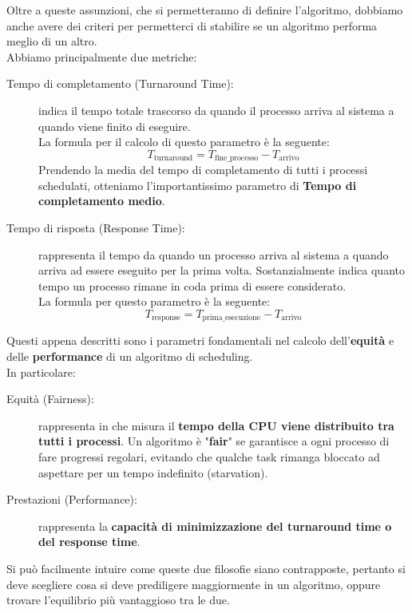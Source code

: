 \documentclass[12pt]{report}
\begin{document}
	Oltre a queste assunzioni, che si permetteranno di definire l'algoritmo, dobbiamo anche avere dei criteri per permetterci di stabilire se un algoritmo performa meglio di un altro.\\
	Abbiamo principalmente due metriche:
	\begin{description}
		\item [Tempo di completamento (Turnaround Time):] indica il tempo totale trascorso da quando il processo arriva al sistema a quando viene finito di eseguire.\\
		La formula per il calcolo di questo parametro è la seguente:
		\[
			T_\text{turnaround} = T_\text{fine\_processo} - T_\text{arrivo}
		\]
		Prendendo la media del tempo di completamento di tutti i processi schedulati, otteniamo l'importantissimo parametro di \textbf{Tempo di completamento medio}.
		
		\item[Tempo di risposta (Response Time):] rappresenta il tempo da quando un processo arriva al sistema a quando arriva ad essere eseguito per la prima volta. Sostanzialmente indica quanto tempo un processo rimane in coda prima di essere considerato.\\
		La formula per questo parametro è la seguente:
		\[
			T_\text{response} = T_\text{prima\_esecuzione} - T_\text{arrivo}
		\]
	\end{description}
	
	Questi appena descritti sono i parametri fondamentali nel calcolo dell'\textbf{equità} e delle \textbf{performance} di un algoritmo di scheduling.\\
	In particolare:
	\begin{description}
		\item [Equità (Fairness):] rappresenta in che misura il \textbf{tempo della CPU viene distribuito tra tutti i processi}. Un algoritmo è "\textbf{fair}" se garantisce a ogni processo di fare progressi regolari, evitando che qualche task rimanga bloccato ad aspettare per un tempo indefinito (starvation).
		
		\item[Prestazioni (Performance):] rappresenta la \textbf{capacità di minimizzazione del turnaround time o del response time}.
	\end{description}
	Si può facilmente intuire come queste due filosofie siano contrapposte, pertanto si deve scegliere cosa si deve prediligere maggiormente in un algoritmo, oppure trovare l'equilibrio più vantaggioso tra le due.
	
\end{document}
